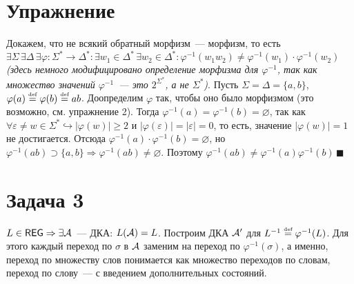 \documentclass[a4paper]{article}
\def\A{{\cal A}}
\def\REG{{\mathsf{REG}}}
\begin{document}
\begin{enumerate}[1.]
\section*{Упражнение}
Докажем, что не всякий обратный морфизм~--- морфизм, то есть $\exists\Sigma\,\exists\Delta\,\exists\varphi\colon\Sigma^*\longrightarrow\Delta^*\colon\exists w_1\in\Delta^*\,\exists w_2\in\Delta^*\colon \varphi^{-1}(w_1w_2)\neq\varphi^{-1}(w_1)\cdot\varphi^{-1}(w_2)$ {\em (здесь немного модифицировано определение морфизма для $\varphi^{-1}$, так как множество значений $\varphi^{-1}$~--- это $2^{\Sigma^*}$, а не $\Sigma^*$)}.\newline
Пусть $\Sigma=\Delta=\{a,b\}$, $\varphi(a)\overset{\mbox{\tiny def}}{=}\varphi(b)\overset{\mbox{\tiny def}}{=}ab$. Доопределим $\varphi$ так, чтобы оно было морфизмом (это возможно, см. упражнение 2). Тогда $\varphi^{-1}(a)=\varphi^{-1}(b)=\varnothing$, так как $\forall \varepsilon\neq w\in\Sigma^*\hookrightarrow|\varphi(w)|\geqslant 2$ и $|\varphi(\varepsilon)|=|\varepsilon|=0$, то есть, значение $|\varphi(w)|=1$ не достигается. Отсюда $\varphi^{-1}(a)\cdot\varphi^{-1}(b)=\varnothing$, но $\varphi^{-1}(ab)\supset\{a,b\}\Rightarrow\varphi^{-1}(ab)\neq\varnothing$. Поэтому $\varphi^{-1}(ab)\neq\varphi^{-1}(a)\varphi^{-1}(b)\,\blacksquare$
\section*{Задача 3}
$L\in\REG\Rightarrow\exists \A$~--- ДКА: $L(\A)=L$. Построим ДКА $\A'$ для $L^{-1}\overset{\mbox{\tiny def}}{=}\varphi^{-1}(L)$. Для этого каждый переход по $\sigma$ в $\A$ заменим на переход по $\varphi^{-1}(\sigma)$, а именно, переход по множеству слов понимается как множество переходов по словам, переход по слову~--- с введением дополнительных состояний.

\end{enumerate}
\end{document}
